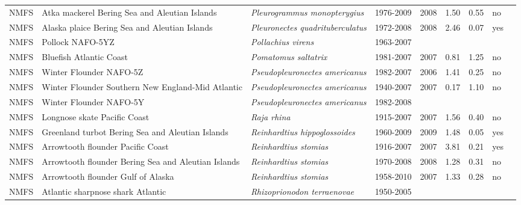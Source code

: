 \begin{longtable}{p{1.8cm}p{4cm}p{4cm}ccccp{1.9cm}c}
  NMFS & Atka mackerel Bering Sea and Aleutian Islands & \textit{Pleurogrammus monopterygius} & 1976-2009 & 2008 & 1.50 & 0.55 & no & \cite{2008_SAFE_BSAIatka.pdf} \\ 
  NMFS & Alaska plaice Bering Sea and Aleutian Islands & \textit{Pleuronectes quadrituberculatus} & 1972-2008 & 2008 & 2.46 & 0.07 & yes & \cite{AFSC-ALPLAICBSAI-2008-Alaska plaice BSAI.pdf} \\ 
  NMFS & Pollock NAFO-5YZ & \textit{Pollachius virens} & 1963-2007 &  &  &  &  & \cite{http://www.nefsc.noaa.gov/nefsc/publications/crd/crd0815/crd0815.pdf} \\ 
  NMFS & Bluefish Atlantic Coast & \textit{Pomatomus saltatrix} & 1981-2007 & 2007 & 0.81 & 1.25 & no & \cite{final-2005-SAW-41-assessment.pdf} \\ 
  NMFS & Winter Flounder NAFO-5Z & \textit{Pseudopleuronectes americanus} & 1982-2007 & 2006 & 1.41 & 0.25 & no & \cite{garm3k.pdf} \\ 
  NMFS & Winter Flounder Southern New England-Mid Atlantic & \textit{Pseudopleuronectes americanus} & 1940-2007 & 2007 & 0.17 & 1.10 & no & \cite{NMFS-SNEMATL-Pseudopleuronectesamercianus-2008.pdf} \\ 
  NMFS & Winter Flounder NAFO-5Y & \textit{Pseudopleuronectes americanus} & 1982-2008 &  &  &  &  & \cite{http://www.nefsc.noaa.gov/nefsc/publications/crd/crd0815/crd0815.pdf} \\ 
  NMFS & Longnose skate Pacific Coast & \textit{Raja rhina} & 1915-2007 & 2007 & 1.56 & 0.40 & no & \cite{NWFSC-LNOSESKAPCOAST-2008-Longnose skate.pdf} \\ 
  NMFS & Greenland turbot Bering Sea and Aleutian Islands & \textit{Reinhardtius hippoglossoides} & 1960-2009 & 2009 & 1.48 & 0.05 & yes & \cite{2008_SAFE_BSAIturbot.pdf} \\ 
  NMFS & Arrowtooth flounder Pacific Coast & \textit{Reinhardtius stomias} & 1916-2007 & 2007 & 3.81 & 0.21 & yes & \cite{NWFSC-ARFLOUNDPCOAST-2007-Arrowtooth flounder.pdf} \\ 
  NMFS & Arrowtooth flounder Bering Sea and Aleutian Islands & \textit{Reinhardtius stomias} & 1970-2008 & 2008 & 1.28 & 0.31 & no & \cite{AFSC-ARFLOUNDBSAI-2007-Arrowtooth flounder BSAI.pdf} \\ 
  NMFS & Arrowtooth flounder Gulf of Alaska & \textit{Reinhardtius stomias} & 1958-2010 & 2007 & 1.33 & 0.28 & no & \cite{2008_SAFE_GOAatf.pdf} \\ 
  NMFS & Atlantic sharpnose shark Atlantic & \textit{Rhizoprionodon terraenovae} & 1950-2005 &  &  &  &  & \cite{SmallcoastalAtl2007-SEFSC.pdf} \\ 

\end{longtable}
